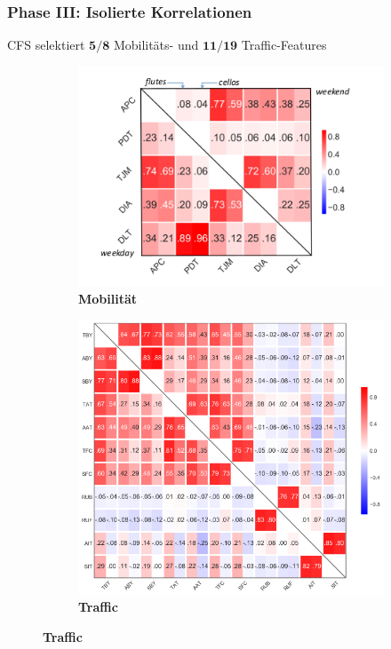 \documentclass{beamer}
\begin{document}
\begin{frame}
  \frametitle{Phase III: Isolierte Korrelationen}
  \textsc{CFS} selektiert $\boldsymbol{5 / 8}$ Mobilitäts- und $\boldsymbol{11 / 19}$ Traffic-Features

  \begin{figure}[H]
    \centering
    \hspace{-3cm}
    \begin{subfigure}[b]{0.45\textwidth}
      \includegraphics[width=1.2\textwidth]{images/mobility_correlations.png}
      \caption*{\textbf{Mobilität}}
    \end{subfigure}
    \hspace{3px}
    \begin{subfigure}[b]{0.45\textwidth}
      \includegraphics[width=1.5\textwidth]{images/traffic_correlations.png}  
      \caption*{\textbf{Traffic}}
    \end{subfigure}    
  \end{figure}  
\end{frame}
\end{document}
